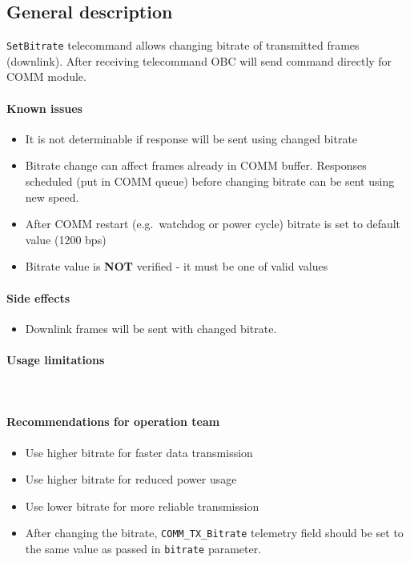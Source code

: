 

\subsection{General description}
\texttt{SetBitrate} telecommand allows changing bitrate of transmitted frames (downlink). After receiving telecommand OBC will send command directly for COMM module. 


\paragraph{Known issues}
\begin{itemize}
	\item It is not determinable if response will be sent using changed bitrate
	\item Bitrate change can affect frames already in COMM buffer. Responses scheduled (put in COMM queue) before changing bitrate can be sent using new speed.
	\item After COMM restart (e.g.\ watchdog or power cycle) bitrate is set to default value (1200 bps)
	\item Bitrate value is \textbf{NOT} verified - it must be one of valid values
\end{itemize}

\paragraph{Side effects} 
\begin{itemize}
	\item Downlink frames will be sent with changed bitrate.
\end{itemize}

\paragraph{Usage limitations} \mbox{} \\
\None

\paragraph{Recommendations for operation team}
\begin{itemize}
	\item Use higher bitrate for faster data transmission
	\item Use higher bitrate for reduced power usage
	\item Use lower bitrate for more reliable transmission
	\item After changing the bitrate, \texttt{COMM_TX_Bitrate} telemetry field should be set to the same value as passed in \texttt{bitrate} parameter.
\end{itemize}

